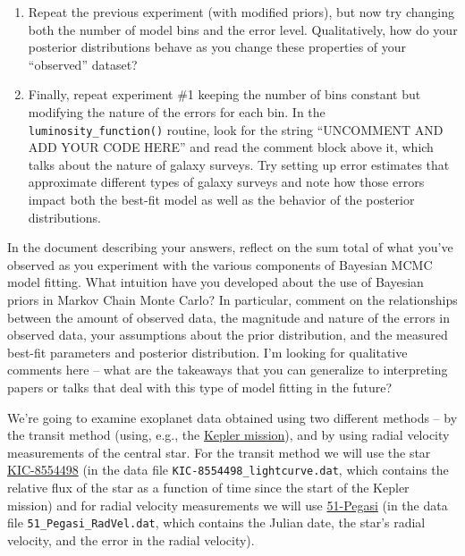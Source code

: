 \documentclass[10pt]{article}
\begin{document}
\begin{enumerate}
\item Repeat the previous experiment (with modified priors), but now
  try changing both the number of model bins and the error level.
  Qualitatively, how do your posterior distributions behave as you
  change these properties of your ``observed'' dataset?

\item Finally, repeat experiment \#1 keeping the number of bins
  constant but modifying the nature of
  the errors for each bin.  In the \texttt{luminosity\_function()}
  routine, look for the string ``UNCOMMENT AND ADD YOUR CODE HERE''
  and read the comment block above it, which talks about the nature of
  galaxy surveys.  Try setting up error estimates that approximate
  different types of galaxy surveys and note how those errors impact
  both the best-fit model as well as the behavior of the posterior
  distributions.

\end{enumerate}

In the document describing your answers, reflect on the sum
total of what you've observed as you experiment with the various
components of Bayesian MCMC model fitting.  What intuition have you
developed about the use of Bayesian priors in Markov Chain Monte
Carlo?  In particular, comment on the relationships between the amount
of observed data, the magnitude and nature of the errors in observed data, your
assumptions about the prior distribution, and the measured best-fit
parameters and posterior distribution.  I'm looking for qualitative
comments here -- what are the takeaways that you can generalize to
interpreting papers or talks that deal with this type of model
fitting in the future?


\newpage

\vspace{5mm}
 We're going to examine exoplanet
data obtained using two different methods -- by the transit method
(using, e.g., the \href{https://science.nasa.gov/mission/kepler/}{Kepler mission}),
and by using radial velocity measurements of the central star.  For
the transit method we will use the star
\href{http://keplerebs.villanova.edu/overview/?k=8554498}{KIC-8554498}
(in the data file \texttt{KIC-8554498\_lightcurve.dat}, which contains
the relative flux of the star as a function of time since the start of
the Kepler mission) and for radial velocity measurements we will use
\href{https://exoplanet.eu/catalog/51_peg_b--12/}{51-Pegasi} (in the data
file \texttt{51\_Pegasi\_RadVel.dat}, which contains the Julian date,
the star's radial velocity, and the error in the radial velocity).
\end{document}
